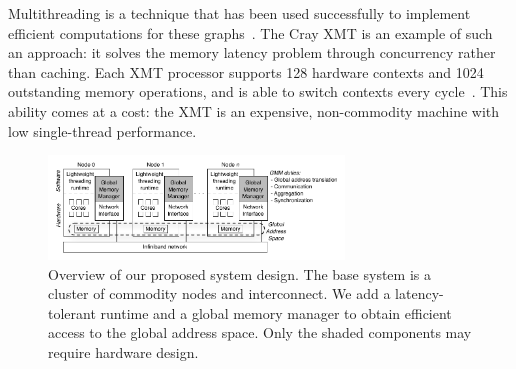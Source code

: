 \documentclass[10pt,nocopyrightspace]{sigplanconf}
\begin{document}






Multithreading is a technique that has been used successfully to
implement efficient computations for these
graphs~\cite{bader:bfsmta}. The Cray {\small XMT} is an example of such an
approach: it solves the memory latency problem through concurrency
rather than caching. Each {\small XMT} processor supports 128 hardware contexts
and 1024 outstanding memory operations, and is able to switch contexts
every cycle~\cite{tera, feo-xmt}. This ability comes at a cost: the
{\small XMT} is an expensive, non-commodity machine with low
single-thread performance.

\begin{figure}[htbp]
  \begin{center}
    \vspace{-0.25in}
    \includegraphics[width=0.7\textwidth]{figures/system-overview.pdf}
    \vspace{-0.1in}
	\end{center}
	\caption{Overview of our proposed system design. The base
          system is a cluster of commodity nodes and interconnect. We
          add a latency-tolerant runtime and a global memory manager
          to obtain efficient access to the global address space. Only
          the shaded components may require hardware design.}
	\label{fig:system-overview}
\end{figure}
\end{document}
